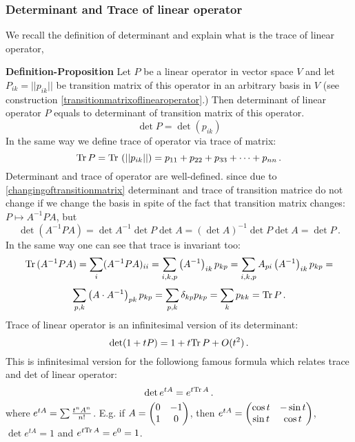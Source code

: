 \documentclass[12pt]{article}
\numberwithin{equation}{section}
\begin{document}
\subsubsection{Determinant and Trace of linear operator}
We recall the definition of determinant and explain what is the trace
of linear operator,

   {\bf Definition-Proposition}
Let $P$ be a linear operator in vector space $V$ and
let $P_{ik}=||p_{ik}||$ be transition matrix of this operator in
an arbitrary basis in $V$ (see construction
\eqref{transitionmatrixoflinearoperator}.) Then
determinant of linear operator $P$ equals to
determinant of transition matrix of this operator.
           $$
  \det P= \det \left(p_{ik}\right)
            $$
In the same way we define trace of operator via trace of matrix:
            \begin{equation}\label{traceofoperator}
      {\rm Tr\,}P={\rm Tr\,}\left(||p_{ik}||\right)=
    p_{11}+p_{22}+p_{33}+\dots+p_{nn}\,.
             \end{equation}
Determinant and trace of operator are well-defined. since
due to \eqref{changingoftransitionmatrix}
determinant and trace of transition matrice do not change
if we change the basis in spite of the  fact that transition matrix changes:
$P\mapsto A^{-1}PA$, but
              $$
              \det \left(A^{-1}PA\right)=
              \det A^{-1}\det P\det A=(\det A)^{-1}\det P \det A=\det P\,.
              $$
{\footnotesize In the same way one can see that trace is invariant too:
             $$
   {\rm Tr\,}(A^{-1}PA)=\sum_i(A^{-1}PA)_{ii}=
\sum_{i,k,p}\left(A^{-1}\right)_{ik}p_{kp}=
\sum_{i,k,p}A_{pi}\left(A^{-1}\right)_{ik}p_{kp}=
          $$
          $$
\sum_{p,k}\left(A\cdot A^{-1}\right)_{pk}p_{kp}=
\sum_{p,k}\delta_{kp}p_{kp}=\sum_k p_{kk}={\rm Tr\,}P\,.
              $$
Trace of linear operator is an infinitesimal version of its determinant:
       $$
   \det(1+tP)=1+t{\rm Tr\,}P+O(t^2)\,.
       $$
This is infinitesimal version for the followiong
famous formula which relates trace and det of linear
operator:
        \begin{equation}\label{Liovilleformula}
         \det e^{tA}=e^{t{\rm Tr\,}A}\,.
         \end{equation}
where $e^{tA}=\sum{t^nA^n\over n!}$. E.g. if
$A=\begin{pmatrix}0 &-1\cr 1 &0\end{pmatrix}$,
then $e^{tA}=\begin{pmatrix} \cos t&-\sin t\cr \sin t &\cos t\end{pmatrix}$,
$\det e^{tA}=1$ and $e^{t{\rm Tr\,}A}=e^0=1$. }
\end{document}
